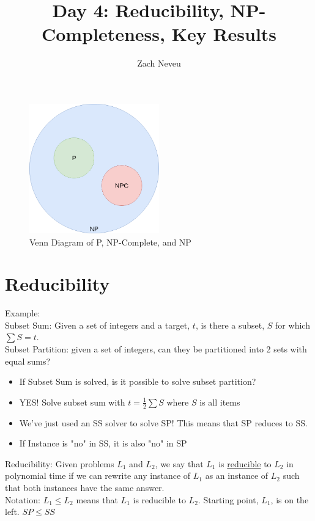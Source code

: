 \documentclass[12pt, letter]{article}
\author{Zach Neveu}
\title{ Day 4: Reducibility, NP-Completeness, Key Results }
\begin{document}
\maketitle
\begin{figure}[h]
	\centering
	\includegraphics[width=0.5\textwidth]{imgs/np}
	\caption{Venn Diagram of P, NP-Complete, and NP}
	\label{fig:imgs-np}
\end{figure}

\section{Reducibility}%
\label{sec:reducibility}
Example: \\
Subset Sum: Given a set of integers and a target, $t$, is there a subset, $S$ for which $\sum S = t$. \\
Subset Partition: given a set of integers, can they be partitioned into 2 sets with equal sums? \\
\begin{itemize}
	\item If Subset Sum is solved, is it possible to solve subset partition? 
	\item YES! Solve subset sum with $t=\frac{1}{2}\sum S$ where $S$ is all items
	\item We've just used an SS solver to solve SP! This means that SP reduces to SS.
	\item If Instance is "no" in SS, it is also "no" in SP
\end{itemize}

Reducibility: Given problems $L_1$ and $L_2$, we say that $L_1$ is \underline{reducible} to $L_2$ in polynomial time if we can rewrite any instance of $L_1$ as an instance of $L_2$ such that both instances have the same answer. \\

Notation: $L_1 \le L_2$ means that $L_1$ is reducible to  $L_2$. Starting point, $L_1$, is on the left. $SP \le SS$ \\
\end{document}
